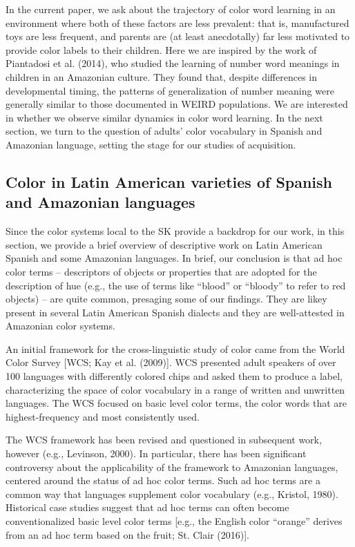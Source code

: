 \documentclass[
  english,
  ,apa7,floatsintext]{apa6}
\begin{document}
In the current paper, we ask about the trajectory of color word learning in an environment where both of these factors are less prevalent: that is, manufactured toys are less frequent, and parents are (at least anecdotally) far less motivated to provide color labels to their children. Here we are inspired by the work of Piantadosi et al. (2014), who studied the learning of number word meanings in children in an Amazonian culture. They found that, despite differences in developmental timing, the patterns of generalization of number meaning were generally similar to those documented in WEIRD populations. We are interested in whether we observe similar dynamics in color word learning. In the next section, we turn to the question of adults' color vocabulary in Spanish and Amazonian language, setting the stage for our studies of acquisition.

\hypertarget{color-in-latin-american-varieties-of-spanish-and-amazonian-languages}{%
\subsection{Color in Latin American varieties of Spanish and Amazonian languages}\label{color-in-latin-american-varieties-of-spanish-and-amazonian-languages}}

Since the color systems local to the SK provide a backdrop for our work, in this section, we provide a brief overview of descriptive work on Latin American Spanish and some Amazonian languages. In brief, our conclusion is that ad hoc color terms -- descriptors of objects or properties that are adopted for the description of hue (e.g., the use of terms like ``blood'' or ``bloody'' to refer to red objects) -- are quite common, presaging some of our findings. They are likey present in several Latin American Spanish dialects and they are well-attested in Amazonian color systems.

An initial framework for the cross-linguistic study of color came from the World Color Survey {[}WCS; Kay et al. (2009){]}. WCS presented adult speakers of over 100 languages with differently colored chips and asked them to produce a label, characterizing the space of color vocabulary in a range of written and unwritten languages. The WCS focused on basic level color terms, the color words that are highest-frequency and most consistently used.

The WCS framework has been revised and questioned in subsequent work, however (e.g., Levinson, 2000). In particular, there has been significant controversy about the applicability of the framework to Amazonian languages, centered around the status of ad hoc color terms. Such ad hoc terms are a common way that languages supplement color vocabulary (e.g., Kristol, 1980). Historical case studies suggest that ad hoc terms can often become conventionalized basic level color terms {[}e.g., the English color ``orange'' derives from an ad hoc term based on the fruit; St. Clair (2016){]}.
\end{document}
